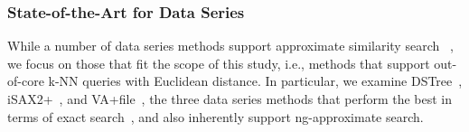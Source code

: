  \begin{comment}
\noindent{\bf CSZ.} The CSZ method\footnote{Since this method was not explicitly named in the original paper, we will refer to it as \emph{CSZ} (from the authors' initials).}~\cite{conf/kdd/ColeSZ05} is a $\delta$-$\epsilon$-approximate  similarity search method based on sketches that finds the most correlated equi-length windows in a set of uncooperative, i.e., noisy time series. Given two windows of equal length, $w_1$ and $w_2$, CSZ computes the similarity between the entire windows $w_1$ and $w_2$ (whole matching). It approximates $w_1$ and $w_2$ with $2b+1$ random projections using $d$ random vectors. The median of the Euclidean distances between these projections approximates the exact distance between $w_1$ and $w_2$. In particular, the approximate distance is $\delta$-$\epsilon$ approximate, where $\epsilon$ is a function of $d$ and $\delta = 1-(1/2)^b$~\cite{conf/kdd/ColeSZ05}.
\end{comment}



















\subsubsection{State-of-the-Art for Data Series}
While a number of data series methods support approximate similarity search ~\cite{conf/icde/shatkay1996,conf/kdd/Keogh1997,conf/ssdm/Wang2000,conf/kdd/ColeSZ05,conf/icdm/Camerra2010,journal/edbt/Schafer2012,conf/vldb/Wang2013,journal/kais/Camerra2014,journal/vldb/Zoumpatianos2016}, we focus on those that fit the scope of this study, i.e., methods that support out-of-core k-NN queries with Euclidean distance. 
In particular, we examine DSTree~\cite{conf/vldb/Wang2013}, iSAX2+~\cite{journal/kais/Camerra2014}, and VA+file~\cite{conf/cikm/Hakan2000}, the three data series methods that perform the best in terms of exact search~\cite{journal/pvldb/echihabi2018}, and also inherently support ng-approximate search.
 

